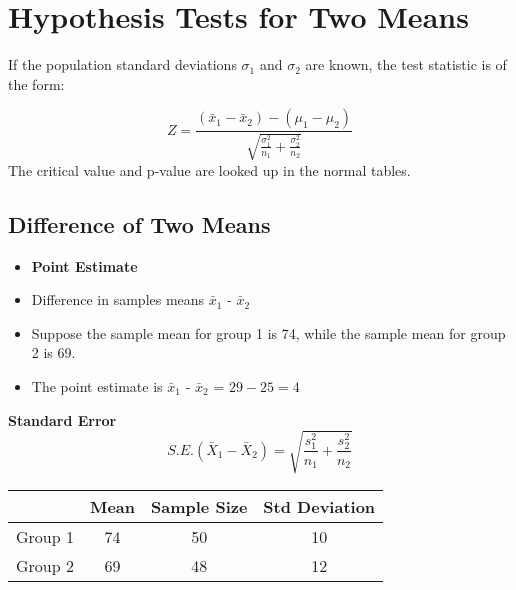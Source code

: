 \documentclass[]{report}
\begin{document}
{\section{Hypothesis Tests for Two Means}

If the population standard deviations $\sigma_1$ and $\sigma_2$
are known, the test statistic is of the form:

\begin{equation}
Z = \frac{(\bar{x}_1 - \bar{x}_2) - (\mu_1 - \mu_2 ) }{\sqrt{
\frac{\sigma^2_1}{n_1}+\frac{\sigma^2_2}{n_2}} }
\end{equation}
The critical value and p-value are looked up in the normal tables.










\subsection{Difference of Two Means}


\begin{itemize}
\item \textbf{Point Estimate}
\item Difference in samples means $\bar{x}_1$ - $\bar{x}_2$
\item Suppose the sample mean for group 1 is 74, while the sample mean for
group 2 is 69.
\item The point estimate is $\bar{x}_1$ - $\bar{x}_2$ = $29 - 25 = 4$
\end{itemize}





\textbf{Standard Error}
\[ S.E.(\bar{X}_1 - \bar{X}_2) = \sqrt{\frac{s^2_1}{n_1} + \frac{s^2_2}{n_2}} \]




\begin{center}
\begin{tabular}{|c|c|c|c|}
\hline  & \phantom{spa}Mean\phantom{spa} & Sample Size & Std Deviation \\ 
\hline \phantom{spa}Group 1\phantom{spa} & 74  & 50 & 10 \\ 
\hline Group 2 & 69  & 48 & 12 \\ 
\hline 
\end{tabular} 
\end{center}

}
\end{document}
